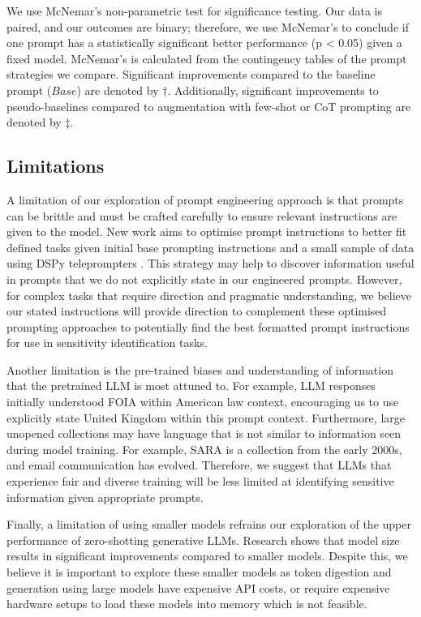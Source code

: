 We use McNemar’s non-parametric test \cite{mcnemar1947note} for significance testing. Our data is paired, and our outcomes are binary; therefore, we use McNemar’s to conclude if one prompt has a statistically significant better performance (p < 0.05) given a fixed model. McNemar’s is calculated from the contingency tables of the prompt strategies we compare. Significant improvements compared to the baseline prompt ($Base$) are denoted by $\dagger$. Additionally, significant improvements to pseudo-baselines compared to augmentation with few-shot or CoT prompting are denoted by $\ddagger$.

\subsection{Limitations}
A limitation of our exploration of prompt engineering approach is that prompts can be brittle and must be crafted carefully to ensure relevant instructions are given to the model. New work aims to optimise prompt instructions to better fit defined tasks given initial base prompting instructions and a small sample of data using DSPy teleprompters \cite{}. This strategy may help to discover information useful in prompts that we do not explicitly state in our engineered prompts. However, for complex tasks that require direction and pragmatic understanding, we believe our stated instructions will provide direction to complement these optimised prompting approaches to potentially find the best formatted prompt instructions for use in sensitivity identification tasks.

Another limitation is the pre-trained biases and understanding of information that the pretrained LLM is most attuned to. For example, LLM responses initially understood FOIA within American law context, encouraging us to use explicitly state United Kingdom within this prompt context. Furthermore, large unopened collections may have language that is not similar to information seen during model training. For example, SARA is a collection from the early 2000s, and email communication has evolved. Therefore, we suggest that LLMs that experience fair and diverse training will be less limited at identifying sensitive information given appropriate prompts.

Finally, a limitation of using smaller models refrains our exploration of the upper performance of zero-shotting generative LLMs. Research shows that model size results in significant improvements compared to smaller models. Despite this, we believe it is important to explore these smaller models as token digestion and generation using large models have expensive API costs, or require expensive hardware setups to load these models into memory which is not feasible.
